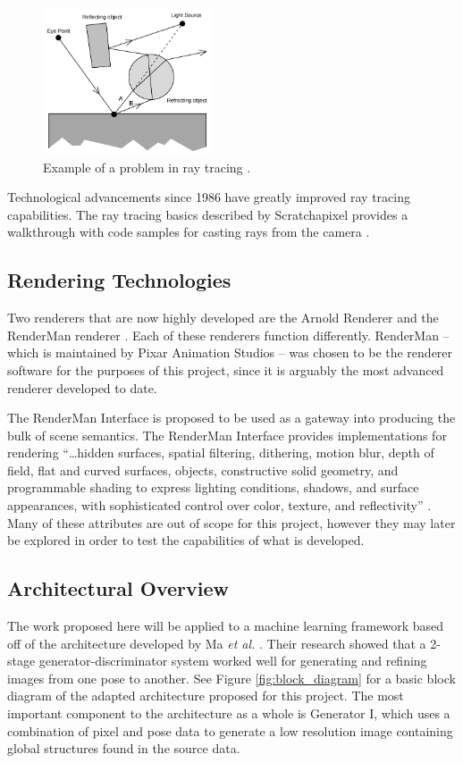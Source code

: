 \documentclass[conference]{IEEEtran}
\begin{document}
\begin{figure}[htbp]
\centerline{\includegraphics[width=5cm]{raytrace.png}}
\caption{Example of a problem in ray tracing \cite{backwards_raytrace}.}
\label{fig:raytrace}
\end{figure}

Technological advancements since 1986 have greatly improved ray tracing capabilities.
The ray tracing basics described by Scratchapixel 
provides a walkthrough with code samples for casting rays from the camera
\cite{raytrace_walkthrough}.

\subsection{Rendering Technologies}
Two renderers that are now highly developed are the Arnold Renderer \cite{arnold}
and the RenderMan renderer \cite{renderman}. Each of these renderers
function differently.
RenderMan -- which is maintained by Pixar Animation Studios --
was chosen to be the renderer software for the purposes of this project,
since it is arguably the most advanced renderer developed to date.

The RenderMan Interface is proposed to be used as a gateway
into producing the bulk of scene semantics.
The RenderMan Interface provides implementations for rendering
``\dots hidden surfaces, spatial filtering, dithering, motion blur, depth of field,
flat and curved surfaces, objects, constructive solid geometry,
and programmable shading to express lighting conditions, shadows, and surface appearances,
with sophisticated control over color, texture, and reflectivity''
\cite{renderman_docs}.
Many of these attributes are out of scope
for this project, however they may later be explored in order to test the capabilities
of what is developed.

\subsection{Architectural Overview}
\label{subsec:architecture}
The work proposed here will be applied to a machine learning framework
based off of the architecture
developed by Ma \textit{et al.} \cite{pose_guided_image_generation}.
Their research showed that a 2-stage generator-discriminator system worked well for generating
and refining images from one pose to another.
See Figure \ref{fig:block_diagram} for a basic block diagram of the adapted architecture
proposed for this project.
The most important component to the architecture as a whole
is Generator I, which uses a combination of pixel and pose data to generate a
low resolution image containing global structures found in the
source data.
\end{document}
